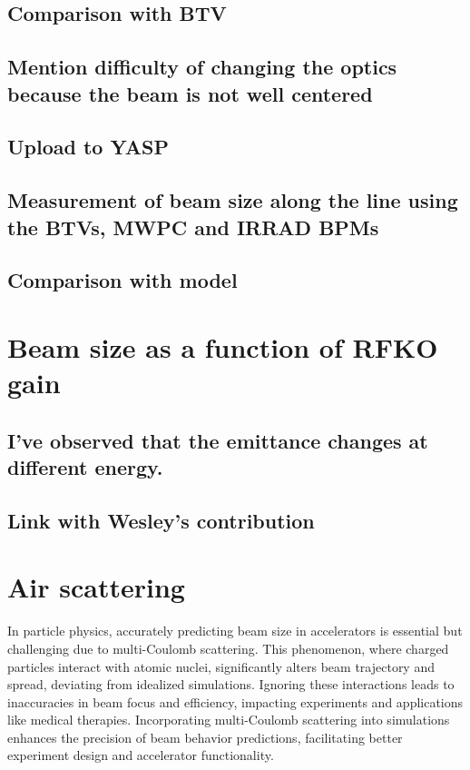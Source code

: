 \documentclass[a4paper,
               biblatex,     %
               ]{jacow}
\begin{document}
\subsection{Comparison with BTV}
\subsection{Mention difficulty of changing the optics because the beam is not well centered}
\subsection{Upload to YASP}
\subsection{Measurement of beam size along the line using the BTVs, MWPC and IRRAD BPMs}
\subsection{Comparison with model}

\section{Beam size as a function of RFKO gain}
\subsection{I've observed that the emittance changes at different energy.}
\subsection{Link with Wesley's contribution}

\section{Air scattering}

In particle physics, accurately predicting beam size in accelerators is essential but challenging due to multi-Coulomb scattering. This phenomenon, where charged particles interact with atomic nuclei, significantly alters beam trajectory and spread, deviating from idealized simulations. Ignoring these interactions leads to inaccuracies in beam focus and efficiency, impacting experiments and applications like medical therapies. Incorporating multi-Coulomb scattering into simulations enhances the precision of beam behavior predictions, facilitating better experiment design and accelerator functionality.
\end{document}
